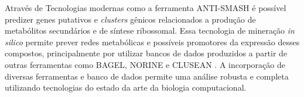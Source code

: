 Através de Tecnologias modernas como a ferramenta ANTI-SMASH \cite{antismash} é possível predizer
genes putativos e \textit{clusters} gênicos relacionados a produção de metabólitos secundários
e de síntese ribossomal. Essa tecnologia de mineração \textit{in silico} permite prever redes
metabólicas e possíveis promotores da expressão desses compostos, principalmente por utilizar
bancos de dados produzidos a partir de outras ferramentas como BAGEL, NORINE e CLUSEAN \cite{bagel2,bagel3,norine,clusean}.
A incorporação de diversas ferramentas e banco de dados permite uma análise robusta 
e completa utilizando tecnologias do estado da arte da biologia computacional.

